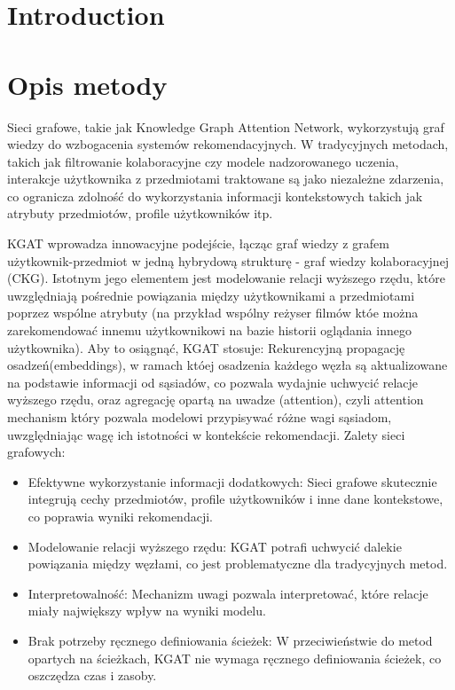 \documentclass[a4paper,onecolumn]{LTJournalArticle}
\begin{document}
	\section{Introduction}
	
	\section{Opis metody}
	Sieci grafowe, takie jak Knowledge Graph Attention Network, wykorzystują graf wiedzy  do wzbogacenia systemów rekomendacyjnych. W tradycyjnych metodach, takich jak filtrowanie kolaboracyjne
	czy modele nadzorowanego uczenia, interakcje użytkownika z przedmiotami traktowane są jako niezależne zdarzenia, co ogranicza zdolność do wykorzystania informacji kontekstowych takich jak atrybuty przedmiotów, profile użytkowników itp.

KGAT wprowadza innowacyjne podejście, łącząc graf wiedzy z grafem użytkownik-przedmiot w jedną hybrydową strukturę - graf wiedzy kolaboracyjnej (CKG). 
Istotnym jego elementem jest modelowanie relacji wyższego rzędu, które uwzględniają pośrednie powiązania między użytkownikami a przedmiotami poprzez wspólne atrybuty 
(na przykład wspólny reżyser filmów któe można zarekomendować innemu użytkownikowi na bazie historii oglądania innego użytkownika). 
Aby to osiągnąć, KGAT stosuje:
Rekurencyjną propagację osadzeń(embeddings), w ramach któej osadzenia każdego węzła są aktualizowane na podstawie informacji od sąsiadów, co pozwala wydajnie uchwycić relacje wyższego rzędu, oraz 
agregację opartą na uwadze (attention), czyli attention mechanism który pozwala modelowi przypisywać różne wagi sąsiadom, uwzględniając wagę ich istotności w kontekście rekomendacji.
Zalety sieci grafowych:
\begin{itemize}
	\item Efektywne wykorzystanie informacji dodatkowych: Sieci grafowe skutecznie integrują cechy przedmiotów, profile użytkowników i inne dane kontekstowe, co poprawia wyniki rekomendacji.
\item Modelowanie relacji wyższego rzędu: KGAT potrafi uchwycić dalekie powiązania między węzłami, co jest problematyczne dla tradycyjnych metod.
\item Interpretowalność: Mechanizm uwagi pozwala interpretować, które relacje miały największy wpływ na wyniki modelu.
\item Brak potrzeby ręcznego definiowania ścieżek: W przeciwieństwie do metod opartych na ścieżkach, KGAT nie wymaga ręcznego definiowania ścieżek, co oszczędza czas i zasoby.
\end{itemize}
\end{document}
